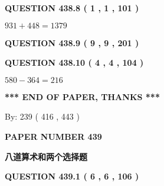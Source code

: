 \documentclass{ctexart}
\begin{document}
  
  
\vspace{0.2in}
  
{\textbf{\Large{QUESTION
438.8 
 ( 1 , 1 , 101 )
}}}
  
  
 
 

$ %
931 +  %
448=   %
1379$
 
 
  
\vspace{0.2in}
  
{\textbf{\Large{QUESTION
438.9 
 ( 9 , 9 , 201 )
}}}
  
  
  
\vspace{0.2in}
  
{\textbf{\Large{QUESTION
438.10 
 ( 4 , 4 , 104 )
}}}
  
  
 
 

$ %
580 -  %
364=   %
216$
 
 
   
   
 \vspace{0.2in}
 
   
   
   
   
\vspace{1.0in} 
{\textbf{\large{ *** END OF PAPER, THANKS *** }}} 
   
   
\hspace{1.0in} By: 
 239 ( 416 ,  443 )
   
   
   
   
\newpage 
\setcounter{page}{ 
   439001 } 
   
   
   
   
 {\textbf{ \Large{ PAPER NUMBER  439  }}}
   
   
\vspace{0.2in}
   
   
   
   
   
   
 \vspace{0.2in}
{\LARGE {\textbf{ 八道算术和两个选择题}}}
   
   
  
\vspace{0.2in}
  
{\textbf{\Large{QUESTION
439.1 
 ( 6 , 6 , 106 )
}}}
  
  
 
\end{document}
